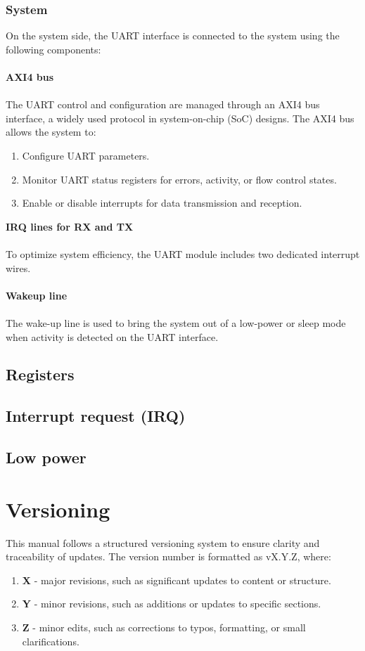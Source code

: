 \documentclass[12pt]{article}
\begin{document}
\subsubsection{System}
On the system side, the UART interface is connected to the system using the following
components:\\~\\
\textbf{AXI4 bus}\\~\\
The UART control and configuration are managed through an AXI4 bus interface, a 
widely used protocol in system-on-chip (SoC) designs. The AXI4 bus allows the system
to:\\
\begin{enumerate}
  \item Configure UART parameters.
  \item Monitor UART status registers for errors, activity, or flow control states.
  \item Enable or disable interrupts for data transmission and reception.
\end{enumerate}

\textbf{IRQ lines for RX and TX}\\~\\
To optimize system efficiency, the UART module includes two dedicated interrupt
wires.\\~\\
\textbf{Wakeup line}\\~\\
The wake-up line is used to bring the system out of a low-power or sleep mode when 
activity is detected on the UART interface.
\subsection{Registers}
\subsection{Interrupt request (IRQ)}
\subsection{Low power}

\section{Versioning}
This manual follows a structured versioning system to ensure
clarity and traceability of updates. The version number is 
formatted as vX.Y.Z, where:
\begin{enumerate}
  \item \textbf{X} - major revisions, such as significant updates to 
            content or structure.
  \item \textbf{Y} - minor revisions, such as additions or updates 
            to specific sections.
  \item \textbf{Z} - minor edits, such as corrections to typos, 
            formatting, or small clarifications.
\end{enumerate}
\end{document}
